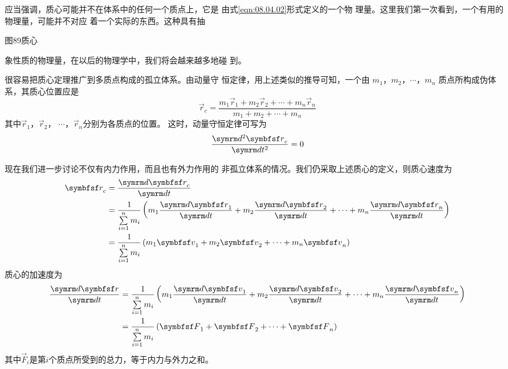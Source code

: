 应当强调，质心可能并不在体系中的任何一个质点上，它是
由式\eqref{eqn:08.04.02}形式定义的一个物
理量。这里我们第一次看到，一个有用的物理量，可能并不对应
着一个实际的东西。这种具有抽

图89质心

象性质的物理量，在以后的物理学中，我们将会越来越多地碰
到。

很容易把质心定理推广到多质点构成的孤立体系。由动量守
恒定律，用上述类似的推导可知，一个由
$ m _ { 1 } $，$ m _ { 2 } $，$ \cdots $，$ m _ { n } $
质点所构成伪体系，其质心位置应是
\begin{equation}\label{eqn:08.04.04}
	\vec { r } _ { c } = \frac { m _ { 1 } \vec { r } _ { 1 } + m _ { 2 } \vec { r } _ { 2 } + \cdots + m _ { n } \vec { r } _ { n } } { m _ { 1 } + m _ { 2 } + \cdots + m _ { n } } 
\end{equation} 
其中$ \vec { r } _ { 1 } $，$ \vec { r } _ { 2 } $，
$ \cdots $，$ \vec { r } _ { n }$分别为各质点的位置。
这时，动量守恒定律可写为
\begin{equation}\label{eqn:08.04.05}
	\frac { \dif ^ { 2 } \vec { r } _ { c } } { \dif t ^ { 2 } } = 0  
\end{equation}

现在我们进一步讨论不仅有内力作用，而且也有外力作用的
非孤立体系的情况。我们仍采取上述质心的定义，则质心速度为
\begin{equation*}
	\begin{split}
		\vec { r } _ { c } & = \frac { \dif \vec { r } _ { c } } { \dif t }  \\
		& = \frac { 1 } { \sum \limits _ { i = 1 } ^ { n } m _ { i } } \left( m _ { 1 } \frac { \dif \vec { r } _ { 1 } } { \dif t } + m _ { 2 } \frac { \dif \vec { r } _ { 2 } } { \dif t } + \cdots + m _ { n } \frac { \dif \vec { r } _ { n } } { \dif t } \right)  \\
		& = \frac { 1 } { \sum \limits _ { i = 1 } ^ { n } m _ { i } } \left( m _ { 1 } \vec { v } _ { 1 } + m _ { 2 } \vec { v } _ { 2 } + \cdots + m _ { n } \vec { v } _ { n } \right)
	\end{split}
\end{equation*}
质心的加速度为
\begin{equation}\label{eqn:08.04.06}
	\begin{split}
		\frac { \dif \vec { r } } { \dif t } & = \frac { 1 } { \sum \limits _ { i = 1 } ^ { n } m _ { i } } \left( m _ { 1 } \frac { \dif \vec { v } _ { 1 } } { \dif t } + m _ { 2 } \frac { \dif \vec { v } _ { 2 } } { \dif t } + \cdots + m _ { n } \frac { \dif \vec { v } _ { n } } { \dif t } \right)  \\
		& = \frac { 1 } { \sum \limits _ { i = 1 } ^ { n } m _ { i } } \left( \vec { F } _ { 1 } + \vec { F } _ { 2 } + \cdots + \vec { F } _ { n } \right)
	\end{split}
\end{equation}
其中$ \vec { F } _ { i } $是第$ i $个质点所受到的总力，等于内力与外力之和。

